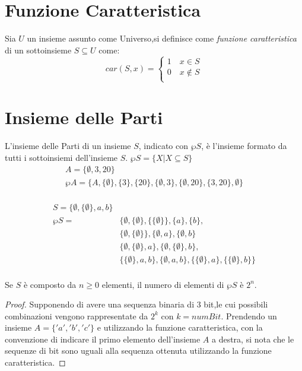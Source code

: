 \section{Funzione Caratteristica}
Sia $U$ un insieme assunto come Universo,si definisce come \emph{funzione caratteristica}
di un sottoinsieme $S \subseteq U$ come:
\begin{equation*}
    car(S,x) = \begin{cases} 1 \quad x \in S \\
                             0 \quad x \not \in S\\
               \end{cases}
\end{equation*}

\section{Insieme delle Parti}
L'insieme delle Parti di un insieme $S$, indicato con $\wp S$, è l'insieme formato
da tutti i sottoinsiemi dell'insieme $S$. \newline
$\wp S = \{X | X \subseteq S\} $
\begin{align*}
A = \{\emptyset,3,20 \} \\
\wp A = \{A,\{\emptyset\},\{ 3\},\{ 20 \},\{ \emptyset,3 \},\{\emptyset,20 \},\{3,20\},\emptyset \} \\
\end{align*}

\begin{align}
S = \{ \emptyset, \{ \emptyset \}, a,b\} \\
\wp S = & \{ \emptyset,\{\emptyset \},\{\{\emptyset\}\},\{a\},\{b\}, \\
        & \{ \emptyset,\{\emptyset\}\}, \{ \emptyset,a\},\{ \emptyset,b\} \\
        & \{ \emptyset,\{\emptyset\},a\},\{\emptyset,\{\emptyset\},b\}, \\
        & \{ \{\emptyset\},a,b\},\{ \emptyset,a,b\},\{\{\emptyset\},a\},\{\{\emptyset\},b\} \} \\
\end{align}

\begin{defi}
Se $S$ è composto da $n \geq 0$ elementi, il numero di elementi di $\wp S$ è $2 ^ n$.
\end{defi}
\begin{proof}
Supponendo di avere una sequenza binaria di 3 bit,le cui possibili combinazioni
vengono rappresentate da $2 ^ k$ con $k = numBit$.\newline
Prendendo un insieme $A = \{'a','b','c' \}$ e utilizzando la funzione caratteristica,
con la convenzione di indicare il primo elemento dell'insieme $A$ a destra, si nota
che le sequenze di bit sono uguali alla sequenza ottenuta utilizzando la funzione caratteristica.
\end{proof}
